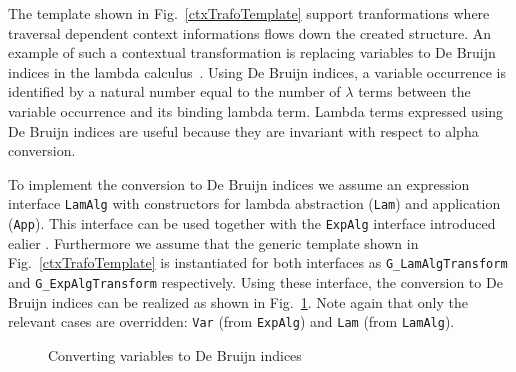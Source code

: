 The template shown in Fig.~\ref{ctxTrafoTemplate} support tranformations where traversal dependent context informations flows down the created structure.
An example of such a contextual transformation is replacing variables  to De Bruijn indices in the lambda calculus~\cite{DeBruijn}.
Using De Bruijn indices, a variable occurrence is identified by a natural number equal to the number of $\lambda$ terms between the variable occurrence and its binding lambda term.
Lambda terms expressed using De Bruijn indices are useful because they are invariant with respect to alpha conversion.

To implement the conversion to De Bruijn indices we assume an expression interface \lstinline{LamAlg} with constructors for lambda abstraction (\lstinline{Lam}) and application (\lstinline{App}).
This interface can be used together with the \lstinline{ExpAlg} interface introduced ealier .
Furthermore we assume that the generic template shown in Fig.~\ref{ctxTrafoTemplate} is instantiated for both interfaces as \lstinline{G_LamAlgTransform} and \lstinline{G_ExpAlgTransform} respectively.
Using these interface, the conversion to De Bruijn indices can be realized as shown in Fig.~\ref{DeBruijn}.
Note again that only the relevant cases are overridden: \lstinline{Var} (from \lstinline{ExpAlg}) and \lstinline{Lam} (from \lstinline{LamAlg}).



\begin{figure}[t]
\vspace{-.1in}
\caption{Converting variables to De Bruijn indices}
\label{DeBruijn}
\end{figure}




